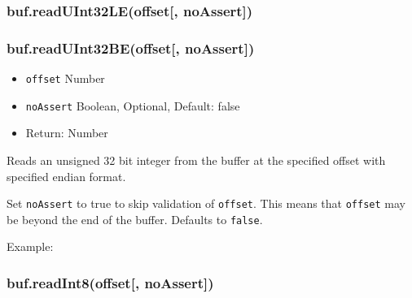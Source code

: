 \subsubsection{buf.readUInt32LE(offset{[},
noAssert{]})}\label{buf.readuint32leoffset-noassert}

\subsubsection{buf.readUInt32BE(offset{[},
noAssert{]})}\label{buf.readuint32beoffset-noassert}

\begin{itemize}
\itemsep1pt\parskip0pt
\item
  \texttt{offset} Number
\item
  \texttt{noAssert} Boolean, Optional, Default: false
\item
  Return: Number
\end{itemize}

Reads an unsigned 32 bit integer from the buffer at the specified offset
with specified endian format.

Set \texttt{noAssert} to true to skip validation of \texttt{offset}.
This means that \texttt{offset} may be beyond the end of the buffer.
Defaults to \texttt{false}.

Example:

\begin{Shaded}
\begin{Highlighting}[]
  \NormalTok{(}\NormalTok{);}

\NormalTok{buf[}\NormalTok{] = }\NormalTok{;}
\NormalTok{buf[}\NormalTok{] = }\NormalTok{;}
\NormalTok{buf[}\NormalTok{] = }\NormalTok{;}
\NormalTok{buf[}\NormalTok{] = }\NormalTok{;}

\NormalTok{(}\NormalTok{(}\NormalTok{));}
\NormalTok{(}\NormalTok{(}\NormalTok{));}

\end{Highlighting}
\end{Shaded}

\subsubsection{buf.readInt8(offset{[},
noAssert{]})}\label{buf.readint8offset-noassert}

